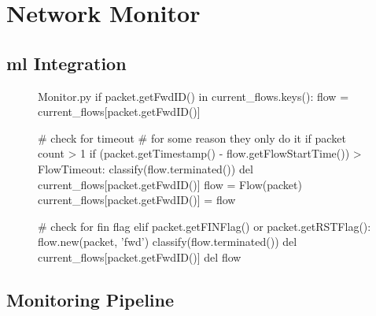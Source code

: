 
\section{Network Monitor}
\label{sec:monitor-implementation}

\textcolor{dimgray}{\lipsum[1]}


\subsection{\gls{ml} Integration}
\label{subsec:ml-integration}

\textcolor{dimgray}{\lipsum[1]}

\begin{figure}
    \begin{code}[colback=white]{Monitor.py}
if packet.getFwdID() in current_flows.keys():
flow = current_flows[packet.getFwdID()]

# check for timeout
# for some reason they only do it if packet count > 1
if (packet.getTimestamp() - flow.getFlowStartTime()) > FlowTimeout:
    classify(flow.terminated())
    del current_flows[packet.getFwdID()]
    flow = Flow(packet)
    current_flows[packet.getFwdID()] = flow

# check for fin flag
elif packet.getFINFlag() or packet.getRSTFlag():
    flow.new(packet, 'fwd')
    classify(flow.terminated())
    del current_flows[packet.getFwdID()]
    del flow
\end{code}
\end{figure}

\textcolor{dimgray}{\lipsum[1]}


\subsection{Monitoring Pipeline}
\label{subsec:monitoring-pipeline}

\textcolor{dimgray}{\lipsum[1]}



